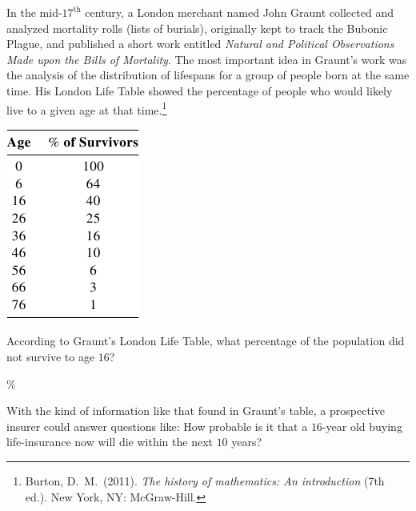 \documentclass{ximera}
\begin{document}
In the mid-$17^\text{th}$ century, a London merchant named John Graunt collected and analyzed mortality rolls (lists of burials), originally kept to track the Bubonic Plague, and published a short work entitled \textit{Natural and Political Observations Made upon the Bills of Mortality}. The most important idea in Graunt's work was the analysis of the distribution of lifespans for a group of people born at the same time. His London Life Table showed the percentage of people who would likely live to a given age at that time.\footnote{Burton, D.\ M.\ (2011). \textit{The history of mathematics: An introduction} (7th ed.). New York, NY: McGraw-Hill.}
\begin{image}
\includegraphics[scale=1.5]{InsuranceTable1.png}
\end{image}

\begin{question}
According to Graunt's London Life Table, what percentage of the population did not survive to age $16$?

$\%$
	
\end{question}

With the kind of information like that found in Graunt's table, a prospective insurer could answer questions like: How probable is it that a $16$-year old buying life-insurance now will die within the next $10$ years?
\end{document}
